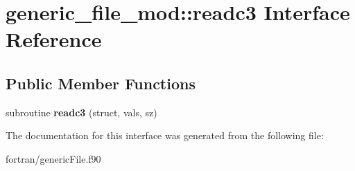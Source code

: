 \hypertarget{interfacegeneric__file__mod_1_1readc3}{}\section{generic\+\_\+file\+\_\+mod\+:\+:readc3 Interface Reference}
\label{interfacegeneric__file__mod_1_1readc3}
\subsection*{Public Member Functions}
\begin{DoxyCompactItemize}
\item 
\mbox{\label{interfacegeneric__file__mod_1_1readc3_af51a7c13df01515543ca183ed03c6153}} 
subroutine {\bfseries readc3} (struct, vals, sz)
\end{DoxyCompactItemize}


The documentation for this interface was generated from the following file\+:\begin{DoxyCompactItemize}
\item 
fortran/generic\+File.\+f90\end{DoxyCompactItemize}

